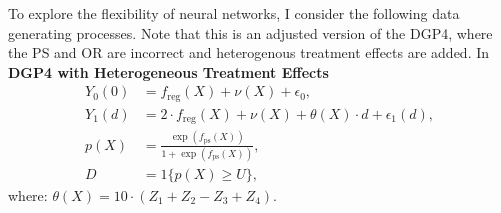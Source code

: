




To explore the flexibility of neural networks, I consider the following data generating processes. Note that this is an adjusted version of the DGP4, where the PS and OR are incorrect and heterogenous treatment effects are added. In \\
\textbf{DGP4 with Heterogeneous Treatment Effects}
\begin{align*}
    Y_0(0) &= f_{\text{reg}}(X) + \nu(X) + \epsilon_0, \\
    Y_1(d) &= 2 \cdot f_{\text{reg}}(X) + \nu(X) + \theta(X) \cdot d + \epsilon_1(d), \\
    p(X) &= \frac{\exp \left( f_{\text{ps}}(X) \right)}{1 + \exp \left( f_{\text{ps}}(X) \right)}, \\
    D &= 1\{ p(X) \geq U \},
\end{align*}
where: $\theta(X) = 10 \cdot (Z_1 + Z_2 - Z_3 + Z_4)$.
